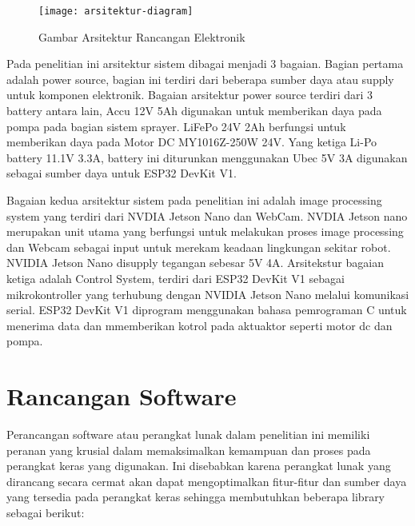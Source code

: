 \begin{figure}[H]
	\centering
	\texttt{[image: arsitektur-diagram]}
	\caption{Gambar Arsitektur Rancangan Elektronik}
	\label{fig:arsitektur-diagram}
\end{figure}

Pada penelitian ini arsitektur sistem dibagai menjadi 3 bagaian. Bagian pertama adalah power source, bagian ini terdiri dari beberapa sumber daya atau supply untuk komponen elektronik. Bagaian arsitektur power source terdiri dari 3 battery antara lain, Accu 12V 5Ah digunakan untuk memberikan daya pada pompa pada bagian sistem sprayer. LiFePo 24V 2Ah berfungsi untuk memberikan daya pada Motor DC MY1016Z-250W 24V. Yang ketiga Li-Po battery 11.1V 3.3A, battery ini diturunkan menggunakan Ubec 5V 3A digunakan sebagai sumber daya untuk ESP32 DevKit V1. 

Bagaian kedua arsitektur sistem pada penelitian ini adalah image processing system yang terdiri dari NVDIA Jetson Nano dan WebCam. NVDIA Jetson nano merupakan unit utama yang berfungsi untuk melakukan proses image processing dan Webcam sebagai input untuk merekam keadaan lingkungan sekitar robot. NVIDIA Jetson Nano disupply tegangan sebesar 5V 4A. Arsitekstur bagaian ketiga adalah Control System, terdiri dari ESP32 DevKit V1 sebagai mikrokontroller yang terhubung dengan NVIDIA Jetson Nano melalui komunikasi serial. ESP32 DevKit V1 diprogram menggunakan bahasa pemrograman C untuk menerima data dan mmemberikan kotrol pada aktuaktor seperti motor dc dan pompa. 

\section{Rancangan Software}
Perancangan software atau perangkat lunak  dalam penelitian ini memiliki peranan yang krusial dalam memaksimalkan kemampuan dan proses pada perangkat keras yang digunakan. Ini disebabkan karena perangkat lunak yang dirancang secara cermat akan dapat mengoptimalkan fitur-fitur dan sumber daya yang tersedia pada perangkat keras sehingga membutuhkan beberapa library sebagai berikut:

